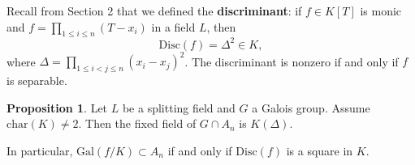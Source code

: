 \documentclass{article}
\theoremstyle{definition}
\newtheorem{prop}[theorem]{Proposition}
\begin{document}
Recall from Section 2 that we defined the \textbf{discriminant}: if $f \in K[T]$ is monic and $f = \prod_{1\le i \le n}^{} (T-x_i)$ in a field $L$, then
\[
\text{Disc}(f) = \Delta^2 \in K,
\]
where $\Delta = \prod_{1\le i < j \le n}^{} (x_i-x_j)^2$. The discriminant is nonzero if and only if $f$ is separable.
\begin{prop}
    Let $L$ be a splitting field and $G$ a Galois group. Assume $\text{char}(K)\neq 2$. Then the fixed field of $G \cap A_n$ is $K(\Delta)$.
    \vspace{1mm}
    
    In particular, $\text{Gal}(f/K) \subset A_n$ if and only if $\text{Disc}(f)$ is a square in $K$.
\end{prop}
\end{document}
